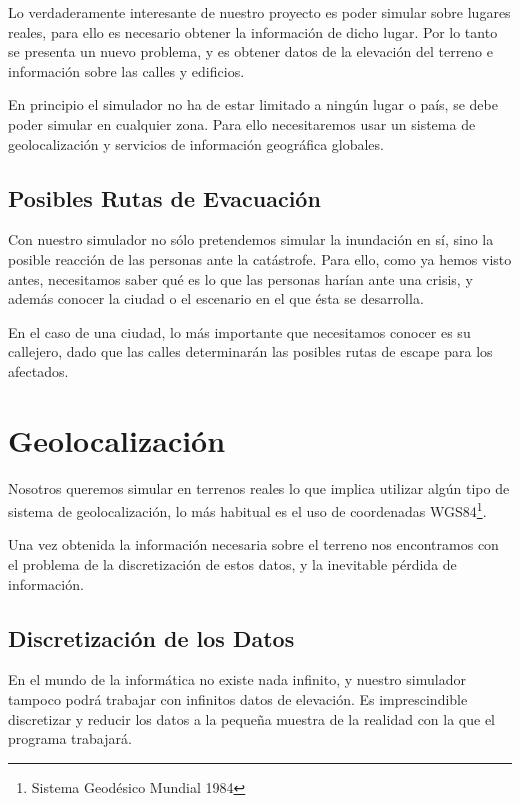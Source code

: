 Lo verdaderamente interesante de nuestro proyecto es poder simular sobre
lugares reales, para ello es necesario obtener la información de dicho lugar.
Por lo tanto se presenta un nuevo problema, y es obtener datos de la elevación
del terreno e información sobre las calles y edificios.

En principio el simulador no ha de estar limitado a ningún lugar o país, se
debe poder simular en cualquier zona. Para ello necesitaremos usar un sistema de
geolocalización y servicios de información geográfica globales.

\subsection{Posibles Rutas de Evacuación}

Con nuestro simulador no sólo pretendemos simular la inundación en sí, sino la
posible reacción de las personas ante la catástrofe. Para ello, como ya hemos
visto antes, necesitamos saber qué es lo que las personas harían ante una
crisis, y además conocer la ciudad o el escenario en el que ésta se desarrolla.

En el caso de una ciudad, lo más importante que necesitamos conocer es su
callejero, dado que las calles determinarán las posibles rutas de escape para
los afectados.

\section{Geolocalización}

Nosotros queremos simular en terrenos reales lo que implica utilizar algún tipo
de sistema de geolocalización, lo más habitual es el uso de coordenadas
WGS84\footnote{Sistema Geodésico Mundial 1984}.

Una vez obtenida la información necesaria sobre el terreno nos encontramos con
el problema de la discretización de estos datos, y la inevitable pérdida de
información.

\subsection{Discretización de los Datos}

En el mundo de la informática no existe nada infinito, y nuestro simulador
tampoco podrá trabajar con infinitos datos de elevación. Es imprescindible
discretizar y reducir los datos a la pequeña muestra de la realidad con la que
el programa trabajará.

